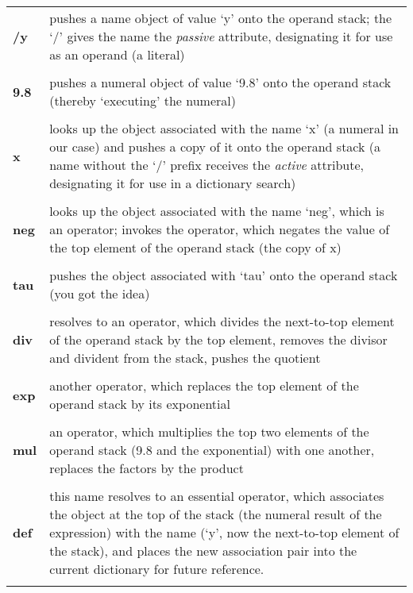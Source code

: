 \begin{tabular}{>{\sffamily\bfseries}p{1cm}>{\normalfont}p{9cm}}
/y & pushes a name object of value `y' onto the operand stack; the `/' gives the name the \emph{passive} attribute, designating it for use as an operand (a literal)\\\\
 
9.8 & pushes  a  numeral  object of value `9.8' onto  the  operand  stack (thereby `executing' the numeral)\\\\

x & looks up the object associated with the name `x' (a numeral in  our case) and pushes a copy of it onto the operand stack (a name without  the `/' prefix receives the \emph{active} attribute, designating it for use in    a dictionary  search)\\\\

neg & looks up the object associated with the name `neg',  which is an operator;  invokes the operator,  which negates the value of the top element of the operand stack (the copy of x)\\\\
 
tau & pushes the object associated with `tau' onto the operand stack  (you got the idea)\\\\

div & resolves to an operator, which divides the next-to-top element of the operand stack by the  top element, removes the divisor and divident from the stack, pushes the quotient\\\\
 
exp & another operator, which replaces the top element of the operand stack by its exponential\\\\

mul & an operator, which multiplies  the  top two elements of the operand stack  (9.8 and the exponential) with one another, replaces the factors by the product\\\\

def & this  name resolves to an essential operator,  which  associates the  object at the top of the stack (the numeral result  of  the expression) with the name (`y',  now the next-to-top element  of the stack), and places the new association pair into the current dictionary for future reference.\\\\

\end{tabular}

